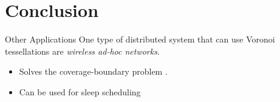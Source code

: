 \documentclass[8pt]{beamer}
\begin{document}
\section{Conclusion}
	\begin{frame}{Other Applications}
		One type of distributed system that can use Voronoi tessellations are \textit{wireless ad-hoc networks}.
		\begin{itemize}
			\item Solves the coverage-boundary problem \cite{carbunar2004distributed}.
			\item Can be used for sleep scheduling \cite{chen2008voronoi}
		\end{itemize}
	\end{frame}	
	



	
\end{document}
